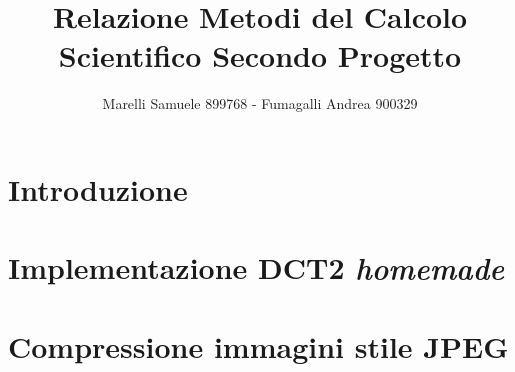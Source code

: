 \documentclass[a4paper,12pt]{article}
\title{Relazione Metodi del Calcolo Scientifico \newline Secondo Progetto}
\author{Marelli Samuele 899768 - Fumagalli Andrea 900329}
\begin{document}
 
	\maketitle
	\section{Introduzione}
	
	\clearpage
	
	\section{Implementazione DCT2 \textit{homemade}}
		
	\clearpage
	
	\section{Compressione immagini stile JPEG}
	
	\clearpage
	
\end{document}
